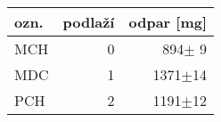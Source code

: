 \begin{tabular}{lrr}
\toprule
ozn. & podlaží& odpar [mg] \\
\midrule
MCH & 0 &894$\pm$ 9  \\
MDC & 1 &1371$\pm$14 \\
PCH & 2 &1191$\pm$12 \\
\bottomrule
\end{tabular}
